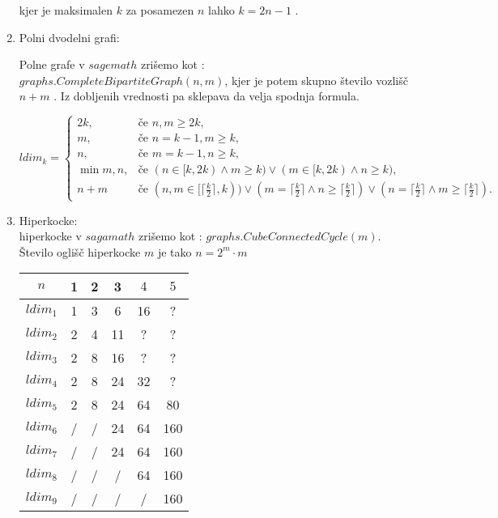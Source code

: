 \documentclass[12pt,a4paper]{amsart}
\theoremstyle{plain} %
\begin{document}
\begin{enumerate}
kjer je maksimalen $k$ za posamezen $n$ lahko $k = 2n -1$ .

\newpage

\item Polni dvodelni grafi:

Polne grafe v $sagemath$ zrišemo kot : $graphs.CompleteBipartiteGraph(n, m)$, kjer je potem skupno število vozlišč $n+m$ . 
Iz dobljenih vrednosti pa sklepava da velja spodnja formula. 

\begin{equation}
ldim_k =
\begin{cases}
  2k, & \text{če } n,m \geq 2k, \\
  m, & \text{če } n = k-1, m\geq k,\\
  n, & \text{če } m = k-1, n\geq k,\\
  \min{m,n}, & \text{če } (n \in [k,2k) \land  m\geq k) \lor (m \in [k,2k) \land  n\geq k) , \\
  n+m & \text{če } (n,m \in [\lceil \frac{k}{2} \rceil,k) ) \lor
  (m = \lceil \frac{k}{2} \rceil \land  n\geq \lceil \frac{k}{2} \rceil)  \lor
  (n = \lceil \frac{k}{2} \rceil \land  m\geq \lceil \frac{k}{2} \rceil) . \nonumber
   
   
  
\end{cases}
\end{equation}


\item Hiperkocke: \\
hiperkocke v $sagamath$ zrišemo kot :
$graphs.CubeConnectedCycle(m)$. Število  oglišč hiperkocke $m $
je tako $n= 2^m \cdot m$

\begin{table}[h]
    \begin{center}
        \begin{tabular}{|c|c|c|c|c|c|}
            \hline
            $n$ & 1 & 2 & 3 & $4$ & $5$ \\
            \hline
            
            
            $ldim_1$ & 1 & 3 & 6 & 16 & ? \\
            $ldim_2$ & 2 & 4 & 11 & ? & ? \\
            $ldim_3$ & 2 & 8 & 16 & ? & ? \\
            $ldim_4$ & 2 & 8 & 24 & 32 & ? \\
            $ldim_5$ & 2 & 8 & 24 & 64 & 80 \\
            $ldim_6$ & / & / & 24 & 64 & 160 \\
            $ldim_7$ & / & / & 24 & 64 & 160 \\
            $ldim_8$ & / & / & / & 64 & 160 \\
            $ldim_9$ & / & / & / & / & 160 \\
            

\end{tabular}
\end{center}
\end{table}
\end{enumerate}
\end{document}

